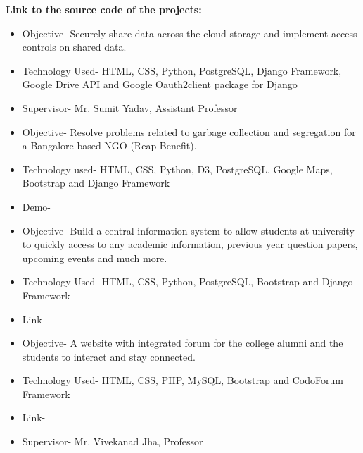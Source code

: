 \documentclass[9.5pt,a4paper]{altacv}
\begin{document}

\textbf{Link to the source code of the projects:} \href{https://github.com/Diksha-Rathi}{}

\medskip

\begin{itemize}
\item Objective- Securely share data across the cloud storage and implement access controls on shared data.
\item Technology Used- HTML, CSS, Python, PostgreSQL, Django Framework, Google Drive API and Google Oauth2client package for Django
\item Supervisor- Mr. Sumit Yadav, Assistant Professor
\end{itemize}

\divider

\begin{itemize}
\item Objective- Resolve problems related to garbage collection and segregation for a Bangalore based NGO (Reap Benefit).
\item Technology used- HTML, CSS, Python, D3, PostgreSQL, Google Maps, Bootstrap and Django Framework
\item Demo- \href{https://youtu.be/UP\_KwSg6GIk}{}
\end{itemize}

\divider

\begin{itemize}
\item Objective- Build a central information system to allow students at university to quickly access to any academic information, previous year question papers, upcoming events and much more.
\item Technology Used- HTML, CSS, Python, PostgreSQL, Bootstrap and Django Framework
\item Link- \href{http://igdtuwonline.herokuapp.com/}{}
\end{itemize}


\begin{itemize}
\item Objective- A website with integrated forum for the college alumni and the students to interact and stay connected.
\item Technology Used- HTML, CSS, PHP, MySQL, Bootstrap and CodoForum Framework
\item Link- \href{http://fatimarafiqui.com/work/igdtuwalumni/}{}
\item Supervisor- Mr. Vivekanad Jha, Professor
\end{itemize}
\end{document}

